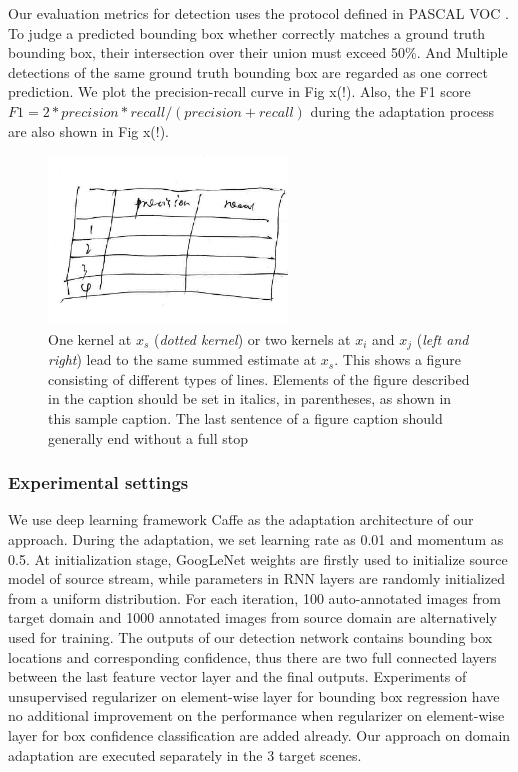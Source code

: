 \documentclass[runningheads]{llncs}
\begin{document}
Our evaluation metrics for detection uses the protocol defined in PASCAL VOC \cite{everingham2015pascal}. To judge a predicted bounding box whether correctly matches a ground truth bounding box, their intersection over their union must exceed 50\%. And Multiple detections of the same ground truth bounding box are regarded as one correct prediction. We plot the precision-recall curve in Fig x(!). Also, the F1 score $F1 = 2*precision*recall/(precision+recall)$ during the adaptation process are also shown in Fig x(!).


\begin{figure}
\centering
\includegraphics[height=4.5cm]{images/precisionrecalltable.png}
\caption{One kernel at $x_s$ ({\it dotted kernel}) or two kernels at
$x_i$ and $x_j$ ({\it left and right}) lead to the same summed estimate
at $x_s$. This shows a figure consisting of different types of
lines. Elements of the figure described in the caption should be set in
italics,
in parentheses, as shown in this sample caption. The last
sentence of a figure caption should generally end without a full stop}
\label{fig:example}
\end{figure}

\subsubsection{Experimental settings}
We use deep learning framework Caffe \cite{jia2014caffe} as the adaptation architecture of our approach. During the adaptation, we set learning rate as 0.01 and momentum as 0.5. At initialization stage, GoogLeNet weights are firstly used to initialize source model of source stream, while parameters in RNN layers are randomly initialized from a uniform distribution. For each iteration, 100 auto-annotated images from target domain and 1000 annotated images from source domain are alternatively used for training. The outputs of our detection network contains bounding box locations and corresponding confidence, thus there are two full connected layers between the last feature vector layer and the final outputs. Experiments of unsupervised regularizer on element-wise layer for bounding box regression have no additional improvement on the performance when regularizer on element-wise layer for box confidence classification are added already. Our approach on domain adaptation are executed separately in the 3 target scenes.
\end{document}
